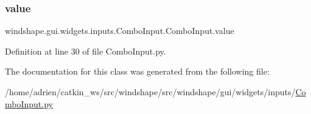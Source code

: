 \subsubsection{\texorpdfstring{value}{value}}
{\footnotesize\ttfamily windshape.\+gui.\+widgets.\+inputs.\+Combo\+Input.\+Combo\+Input.\+value}



Definition at line 30 of file Combo\+Input.\+py.



The documentation for this class was generated from the following file\+:\begin{DoxyCompactItemize}
\item 
/home/adrien/catkin\+\_\+ws/src/windshape/src/windshape/gui/widgets/inputs/\mbox{\hyperlink{_combo_input_8py}{Combo\+Input.\+py}}\end{DoxyCompactItemize}

